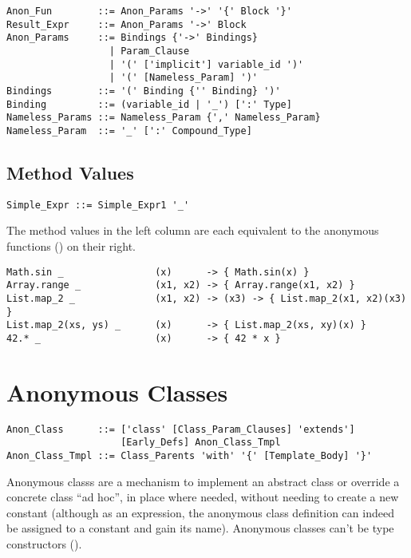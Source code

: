 \syntax\begin{lstlisting}
Anon_Fun        ::= Anon_Params '->' '{' Block '}'
Result_Expr     ::= Anon_Params '->' Block 
Anon_Params     ::= Bindings {'->' Bindings}
                  | Param_Clause
                  | '(' ['implicit'] variable_id ')'
                  | '(' [Nameless_Param] ')'
Bindings        ::= '(' Binding {'' Binding} ')'
Binding         ::= (variable_id | '_') [':' Type]
Nameless_Params ::= Nameless_Param {',' Nameless_Param}
Nameless_Param  ::= '_' [':' Compound_Type]
\end{lstlisting}







\subsection{Method Values}

\syntax\begin{lstlisting}
Simple_Expr ::= Simple_Expr1 '_'
\end{lstlisting}

\example The method values in the left column are each equivalent to the anonymous functions () on their right. 
\begin{lstlisting}[deletekeywords={range}]
Math.sin _                (x)      -> { Math.sin(x) }
Array.range _             (x1, x2) -> { Array.range(x1, x2) }
List.map_2 _              (x1, x2) -> (x3) -> { List.map_2(x1, x2)(x3) }
List.map_2(xs, ys) _      (x)      -> { List.map_2(xs, xy)(x) }
42.* _                    (x)      -> { 42 * x }
\end{lstlisting}







\section{Anonymous Classes}
\label{sec:anonymous-classes}

\syntax\begin{lstlisting}
Anon_Class      ::= ['class' [Class_Param_Clauses] 'extends'] 
                    [Early_Defs] Anon_Class_Tmpl
Anon_Class_Tmpl ::= Class_Parents 'with' '{' [Template_Body] '}'
\end{lstlisting}

Anonymous classs are a mechanism to implement an abstract class or override a concrete class ``ad hoc'', in place where needed, without needing to create a new constant (although as an expression, the anonymous class definition can indeed be assigned to a constant and gain its name). Anonymous classes can't be type constructors (). 


